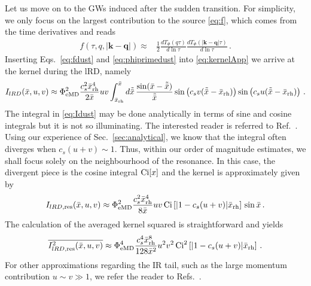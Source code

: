 \documentclass[a4paper,11pt]{article}
\numberwithin{equation}{section}
\begin{document}
Let us move on to the GWs induced after the sudden transition. For simplicity, we only focus on the largest contribution to the source \eqref{eq:f}, which comes from the time derivatives and  reads
\begin{align}\label{eq:fdust}
f(\tau, q,|\mathbf{k-q}|)\approx&\frac{1}{2}\frac{dT_\Phi(q\tau)}{d\ln\tau}\frac{dT_\Phi(|\mathbf{k}-\mathbf{q}|\tau)}{d\ln\tau}\,.
\end{align}
Inserting Eqs.~\eqref{eq:fdust} and \eqref{eq:phiprimedust} into \eqref{eq:kernelApp} we arrive at the kernel during the lRD, namely
\begin{align}\label{eq:Idust}
I_{lRD}(\bar x,u,v)\approx \Phi_{\rm eMD}^2\frac{c_s^2{\bar x_{\rm rh}^4}}{2\bar x}uv\int^{\bar x}_{\bar x_{\rm rh}}d\tilde{\bar x}\, \frac{\sin(\bar x-\tilde{\bar x})}{\tilde{\bar x}}\sin \left(c_sv(\tilde{\bar x}-\bar x_{\rm rh})\right)\sin \left(c_su(\tilde{\bar x}-\bar x_{\rm rh})\right)\,.
\end{align}
The integral in \eqref{eq:Idust} may be done analytically in terms of sine and cosine integrals but it is not so illuminating. The interested reader is referred to Ref.~\cite{Inomata:2019ivs}. Using our experience of Sec.~\ref{sec:analytical}, we know that the integral often diverges when $c_s(u+v)\sim 1$. Thus, within our order of magnitude estimates, we shall focus solely on the neighbourhood of the resonance. In this case, the divergent piece is the cosine integral ${\rm Ci}[x]$ and the kernel is approximately given by
\begin{align}
I_{lRD,\rm res}(\bar x,u,v)\approx \Phi_{\rm eMD}^2\frac{c_s^2{\bar x_{\rm rh}^4}}{8\bar x}uv\,{\rm Ci}\left[|1-c_s(u+v)|\bar x_{\rm rh}\right]\,\sin\bar x\,.
\end{align}
The calculation of the averaged kernel squared is straightforward and yields
\begin{align}\label{eq:I2dust}
\overline{I^2_{lRD,\rm res}(\bar x,u,v)}\approx \Phi_{\rm eMD}^4\frac{c_s^4{\bar x_{\rm rh}^8}}{128\bar x^2}u^2v^2\,{\rm Ci}^2\left[|1-c_s(u+v)|\bar x_{\rm rh}\right]\,.
\end{align}
For other approximations regarding the IR tail, such as the large momentum contribution $u\sim v\gg1$, we refer the reader to Refs.~\cite{Inomata:2019ivs,Inomata:2020lmk}.
\end{document}
